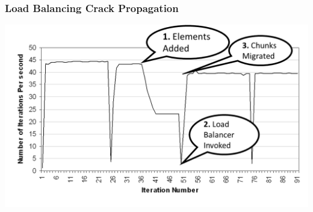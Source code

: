 \begin{frame}[fragile]
\frametitle{Load Balancing Crack Propagation}
\begin{centering}
\includegraphics[width=1.0\textwidth]{../figures/LButilizationCrackPropWithAnnotation}
\end{centering}
\end{frame}

